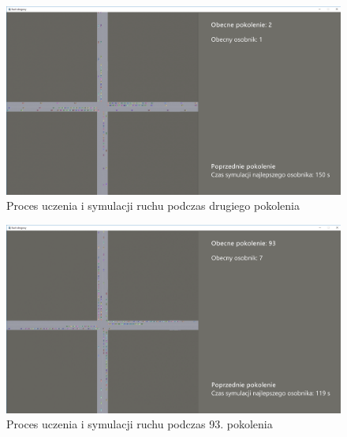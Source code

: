 \begin{figure}
	\centering
	\includegraphics[width=1\linewidth]{ap3}
	\caption[Proces uczenia i symulacji ruchu]{Proces uczenia i symulacji ruchu podczas drugiego pokolenia}
	\label{fig:ap3}
\end{figure}
\begin{figure}
	\centering
	\includegraphics[width=1\linewidth]{ap4}
	\caption[Proces uczenia i symulacji ruchu]{Proces uczenia i symulacji ruchu podczas 93. pokolenia}
	\label{fig:ap4}
\end{figure}



